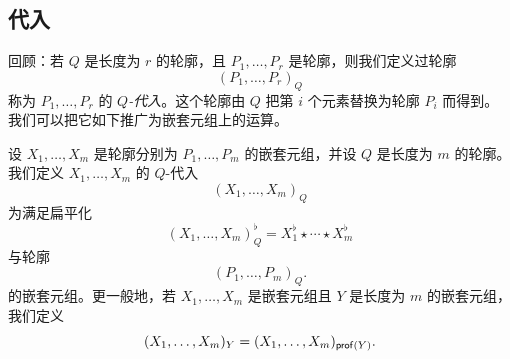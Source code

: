 


\subsection{代入}

回顾：若 $Q$ 是长度为 $r$ 的轮廓，且 $P_1,\dots,P_r$ 是轮廓，则我们定义过轮廓
\[
(P_1,\dots,P_r)_Q
\]
称为 $P_1,\dots,P_r$ 的 $Q${\it-代入}。这个轮廓由 $Q$ 把第 $i$ 个元素替换为轮廓 $P_i$ 而得到。我们可以把它如下推广为嵌套元组上的运算。

\begin{definition}
    设 $X_1,\dots,X_m$ 是轮廓分别为 $P_1,\dots,P_m$ 的嵌套元组，并设 $Q$ 是长度为 $m$ 的轮廓。我们定义 $X_1,\dots,X_m$ 的 $Q$-代入
    \[
    (X_1,\dots,X_m)_Q
    \]
    为满足扁平化
    \[
    (X_1,\dots,X_m)_Q^\flat = X_1^\flat \star \cdots \star X_m^\flat
    \]
    与轮廓
    \[
    (P_1,\dots,P_m)_Q.
    \]
    的嵌套元组。更一般地，若 $X_1,\dots,X_m$ 是嵌套元组且 $Y$ 是长度为 $m$ 的嵌套元组，我们定义
    \[
    (X_1,\dots,X_m)_Y = (X_1,\dots,X_m)_{\mathsf{prof}(Y)}.
    \]
\end{definition}





